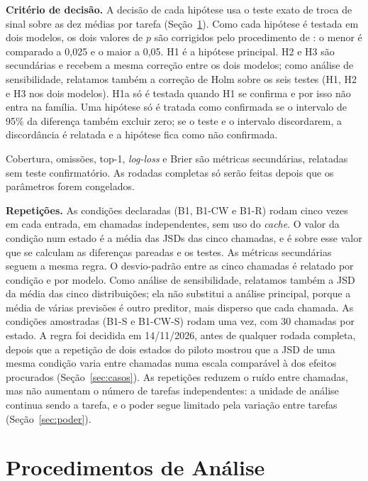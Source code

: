\documentclass[12pt,oneside,a4paper,chapter=TITLE,english,brazil]{abntex2}
\begin{document}
\textbf{Critério de decisão.} A decisão de cada hipótese usa o teste exato de troca de sinal sobre as dez médias por tarefa (Seção~\ref{sec:inferencia}). Como cada hipótese é testada em dois modelos, os dois valores de $p$ são corrigidos pelo procedimento de : o menor é comparado a 0,025 e o maior a 0,05. H1 é a hipótese principal. H2 e H3 são secundárias e recebem a mesma correção entre os dois modelos; como análise de sensibilidade, relatamos também a correção de Holm sobre os seis testes (H1, H2 e H3 nos dois modelos). H1a só é testada quando H1 se confirma e por isso não entra na família. Uma hipótese só é tratada como confirmada se o intervalo de 95\% da diferença também excluir zero; se o teste e o intervalo discordarem, a discordância é relatada e a hipótese fica como não confirmada.

Cobertura, omissões, top-1, \textit{log-loss} e Brier são métricas secundárias, relatadas sem teste confirmatório. As rodadas completas só serão feitas depois que os parâmetros forem congelados. 

\textbf{Repetições.} As condições declaradas (B1, B1-CW e B1-R) rodam cinco vezes em cada entrada, em chamadas independentes, sem uso do \textit{cache}. O valor da condição num estado é a média das JSDs das cinco chamadas, e é sobre esse valor que se calculam as diferenças pareadas e os testes. As métricas secundárias seguem a mesma regra. O desvio-padrão entre as cinco chamadas é relatado por condição e por modelo. Como análise de sensibilidade, relatamos também a JSD da média das cinco distribuições; ela não substitui a análise principal, porque a média de várias previsões é outro preditor, mais disperso que cada chamada. As condições amostradas (B1-S e B1-CW-S) rodam uma vez, com 30 chamadas por estado. A regra foi decidida em 14/11/2026, antes de qualquer rodada completa, depois que a repetição de dois estados do piloto mostrou que a JSD de uma mesma condição varia entre chamadas numa escala comparável à dos efeitos procurados (Seção~\ref{sec:casos}). As repetições reduzem o ruído entre chamadas, mas não aumentam o número de tarefas independentes: a unidade de análise continua sendo a tarefa, e o poder segue limitado pela variação entre tarefas (Seção~\ref{sec:poder}).

\section{Procedimentos de Análise}
\label{sec:inferencia}
\end{document}
